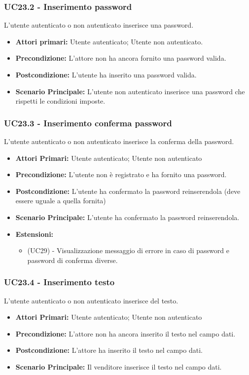 \subsubsection{UC23.2 - Inserimento password}
\label{UC23.2}
L'utente autenticato o non autenticato inserisce una password.
\begin{itemize}
    \item \textbf{Attori primari:} Utente autenticato; Utente non autenticato.
    \item \textbf{Precondizione:} L'attore non ha ancora fornito una password valida.
    \item \textbf{Postcondizione:} L'utente ha inserito una password valida.
    \item \textbf{Scenario Principale:} L'utente non autenticato inserisce una password che rispetti le condizioni imposte.
\end{itemize}

\subsubsection{UC23.3 - Inserimento conferma password}
\label{UC23.3}
L'utente autenticato o non autenticato inserisce la conferma della password.
\begin{itemize}
    \item \textbf{Attori Primari:} Utente autenticato; Utente non autenticato
    \item \textbf{Precondizione:} L'utente non è registrato e ha fornito una password.
    \item \textbf{Postcondizione:} L'utente ha confermato la password reinserendola (deve essere uguale a quella fornita)
    \item \textbf{Scenario Principale:} L'utente ha confermato la password reinserendola.
    \item \textbf{Estensioni:}
    \begin{itemize}
        \item (UC29) - Visualizzazione messaggio di errore in caso di password e password di conferma diverse.
    \end{itemize}
\end{itemize}

\subsubsection{UC23.4 - Inserimento testo} 
\label{UC23.4}
L'utente autenticato o non autenticato inserisce del testo.
\begin{itemize}
    \item \textbf{Attori Primari:} Utente autenticato; Utente non autenticato
    \item \textbf{Precondizione:} L'attore non ha ancora inserito il testo nel campo dati.
    \item \textbf{Postcondizione:} L'attore ha inserito il testo nel campo dati.
    \item \textbf{Scenario Principale:} Il venditore inserisce il testo nel campo dati.
\end{itemize}

